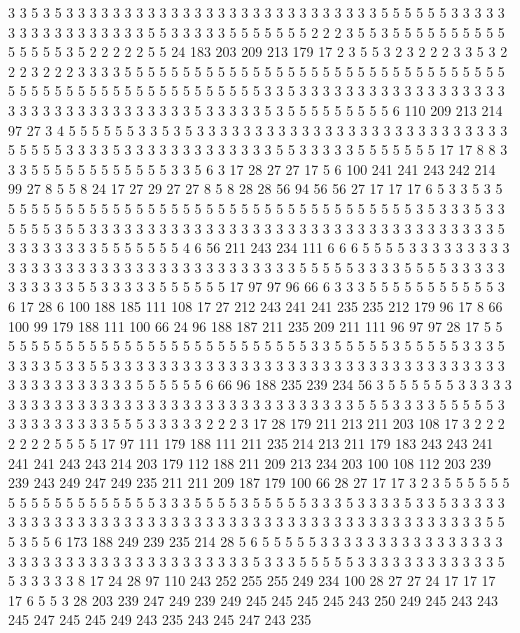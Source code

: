 3 3 5 3 5 3 3 3 3 3 3 3 3 3 3 3 3 3 3 3
3 3 3 3 3 3 3 3 3 3 3 3 5 5 5 5 5 5 3 3
3 3 3 3 3 3 3 3 3 3 3 3 3 3 3 5 5 3 3 3
3 3 5 5 5 5 5 5 5 2 2 2 3 5 5 3 5 5 5 5
5 5 5 5 5 5 5 5 5 5 5 3 5 2 2 2 2 2 5 5
24 183 203 209 213 179 17 2 3 5 5 3 2 3 2 2 2 3 3 5
3 2 2 2 3 2 2 2 3 3 3 3 5 5 5 5 5 5 5 5
5 5 5 5 5 5 5 5 5 5 5 5 5 5 5 5 5 5 5 5
5 5 5 5 5 5 5 5 5 5 5 5 5 5 5 5 5 5 5 5
5 5 5 5 5 5 5 3 3 5 3 3 3 3 3 3 3 3 3 3
3 3 3 3 3 3 3 3 3 3 3 3 3 3 3 3 3 3 3 3
3 3 3 3 5 3 3 3 3 3 5 3 5 5 5 5 5 5 5 5
5 6 110 209 213 214 97 27 3 4 5 5 5 5 5 5 3 3 5 3
5 3 3 3 3 3 3 3 3 3 3 3 3 3 3 3 3 3 3 3
3 3 3 3 3 3 3 3 5 5 5 5 5 3 3 3 3 5 3 3
3 3 3 3 3 3 3 3 3 3 3 5 5 3 3 3 3 3 5 5
5 5 5 5 5 17 17 8 8 3 3 3 5 5 5 5 5 5 5 5
5 5 5 5 3 3 5 6 3 17 28 27 27 17 5 6 100 241 241 243
242 214 99 27 8 5 5 8 24 17 27 29 27 27 8 5 8 28 28 56
94 56 56 27 17 17 17 6 5 3 3 5 3 5 5 5 5 5 5 5
5 5 5 5 5 5 5 5 5 5 5 5 5 5 5 5 5 5 5 5
5 5 5 5 5 5 5 5 5 3 5 3 3 3 5 3 3 5 5 5
5 3 5 5 3 3 3 3 3 3 3 3 3 3 3 3 3 3 3 3
3 3 3 3 3 3 3 3 3 3 3 3 3 3 3 3 3 3 3 5
3 3 3 3 3 3 3 3 5 5 5 5 5 5 5 4 6 56 211 243
234 111 6 6 6 5 5 5 5 3 3 3 3 3 3 3 3 3 3 3
3 3 3 3 3 3 3 3 3 3 3 3 3 3 3 3 3 3 3 3
3 3 3 5 5 5 5 5 3 3 3 3 5 5 5 5 3 3 3 3
3 3 3 3 3 3 3 5 5 3 3 3 3 3 5 5 5 5 5 5
17 97 97 96 66 6 3 3 3 5 5 5 5 5 5 5 5 5 5 5
3 6 17 28 6 100 188 185 111 108 17 27 212 243 241 241 235 235 212 179
96 17 8 66 100 99 179 188 111 100 66 24 96 188 187 211 235 209 211 111
96 97 97 28 17 5 5 5 5 5 5 5 5 5 5 5 5 5 5 5
5 5 5 5 5 5 5 5 5 5 5 5 5 3 3 5 5 5 5 5
3 5 5 5 5 5 3 3 3 5 3 3 3 3 5 3 3 5 5 3
3 3 3 3 3 3 3 3 3 3 3 3 3 3 3 3 3 3 3 3
3 3 3 3 3 3 3 3 3 3 3 3 3 3 3 3 3 3 3 3
3 3 3 3 5 5 5 5 5 5 6 66 96 188 235 239 234 56 3 5
5 5 5 5 5 3 3 3 3 3 3 3 3 3 3 3 3 3 3 3
3 3 3 3 3 3 3 3 3 3 3 3 3 3 3 3 3 3 3 3
5 5 5 3 3 3 3 5 5 5 5 5 3 3 3 3 3 3 3 3
3 3 5 5 5 3 3 3 3 3 2 2 2 3 17 28 179 211 213 211
203 108 17 3 2 2 2 2 2 2 2 5 5 5 5 17 97 111 179 188
111 211 235 214 213 211 179 183 243 243 241 241 241 243 243 214 203 179 112 188
211 209 213 234 203 100 108 112 203 239 239 243 249 247 249 235 211 211 209 187
179 100 66 28 27 17 17 3 2 3 5 5 5 5 5 5 5 5 5 5
5 5 5 5 5 5 5 5 5 3 3 3 5 5 5 5 3 5 5 5
5 5 3 3 3 5 3 3 3 3 5 3 3 5 3 3 3 3 3 3
3 3 3 3 3 3 3 3 3 3 3 3 3 3 3 3 3 3 3 3
3 3 3 3 3 3 3 3 3 3 3 3 3 3 3 3 3 3 3 3
5 5 5 3 5 5 6 173 188 249 239 235 214 28 5 6 5 5 5 5
5 3 3 3 3 3 3 3 3 3 3 3 3 3 3 3 3 3 3 3
3 3 3 3 3 3 3 3 3 3 3 3 3 3 3 3 3 3 5 3
3 3 5 5 5 5 5 3 3 3 3 3 3 3 3 3 3 3 3 5
5 3 3 3 3 3 8 17 24 28 97 110 243 252 255 255 249 234 100 28
27 27 24 17 17 17 17 6 5 5 3 28 203 239 247 249 239 249 245 245
245 245 243 250 249 245 243 243 245 247 245 245 249 243 235 243 245 247 243 235
